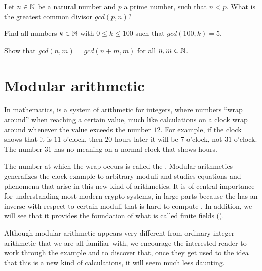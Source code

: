 \begin{exercise}
\label{exercise_towards_counting_numbers}
Let $n\in \mathbb{N}$ be a natural number and $p$ a prime number, such that $n<p$. What is the greatest common divisor $gcd(p,n)$?
\end{exercise}
\begin{exercise}
Find all numbers $k\in\mathbb{N}$ with $0\leq k \leq 100$ such that $gcd(100,k) = 5$.
\end{exercise}
\begin{exercise}
Show that $gcd(n,m) = gcd(n+m,m)$ for all $n,m\in\mathbb{N}$.
\end{exercise}
\section{Modular arithmetic}
\label{modular_arithmetics}
In mathematics,  is a system of arithmetic for integers, where numbers ``wrap around'' when reaching a certain value, much like calculations on a clock wrap around whenever the value exceeds the number $12$. For example, if the clock shows that it is $11$ o'clock, then $20$ hours later it will be $7$ o'clock, not $31$ o'clock. The number $31$ has no meaning on a normal clock that shows hours. 

The number at which the wrap occurs is called the . Modular arithmetics generalizes the clock example to arbitrary moduli and studies equations and phenomena that arise in this new kind of arithmetics. It is of central importance for understanding most modern crypto systems, in large parts because the  has an inverse with respect to certain moduli that is hard to compute . In addition, we will see that it provides the foundation of what is called finite fields ().

Although modular arithmetic appears very different from ordinary integer arithmetic that we are all familiar with, we encourage the interested reader to work through the example and to discover that, once they get used to the idea that this is a new kind of calculations, it will seem much less daunting.


